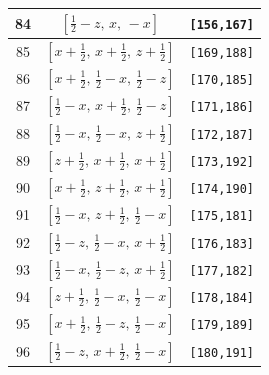 \documentclass[fleqn,8pt]{jsarticle}
\begin{document}
\begin{longtable}{ccc}
84 & $\left[ \frac{1}{2} - z,\, x,\, - x \right]$ & {\tt [156,167]} \\ \hline
85 & $\left[ x + \frac{1}{2},\, x + \frac{1}{2},\, z + \frac{1}{2} \right]$ & {\tt [169,188]} \\ \hline
86 & $\left[ x + \frac{1}{2},\, \frac{1}{2} - x,\, \frac{1}{2} - z \right]$ & {\tt [170,185]} \\ \hline
87 & $\left[ \frac{1}{2} - x,\, x + \frac{1}{2},\, \frac{1}{2} - z \right]$ & {\tt [171,186]} \\ \hline
88 & $\left[ \frac{1}{2} - x,\, \frac{1}{2} - x,\, z + \frac{1}{2} \right]$ & {\tt [172,187]} \\ \hline
89 & $\left[ z + \frac{1}{2},\, x + \frac{1}{2},\, x + \frac{1}{2} \right]$ & {\tt [173,192]} \\ \hline
90 & $\left[ x + \frac{1}{2},\, z + \frac{1}{2},\, x + \frac{1}{2} \right]$ & {\tt [174,190]} \\ \hline
91 & $\left[ \frac{1}{2} - x,\, z + \frac{1}{2},\, \frac{1}{2} - x \right]$ & {\tt [175,181]} \\ \hline
92 & $\left[ \frac{1}{2} - z,\, \frac{1}{2} - x,\, x + \frac{1}{2} \right]$ & {\tt [176,183]} \\ \hline
93 & $\left[ \frac{1}{2} - x,\, \frac{1}{2} - z,\, x + \frac{1}{2} \right]$ & {\tt [177,182]} \\ \hline
94 & $\left[ z + \frac{1}{2},\, \frac{1}{2} - x,\, \frac{1}{2} - x \right]$ & {\tt [178,184]} \\ \hline
95 & $\left[ x + \frac{1}{2},\, \frac{1}{2} - z,\, \frac{1}{2} - x \right]$ & {\tt [179,189]} \\ \hline
96 & $\left[ \frac{1}{2} - z,\, x + \frac{1}{2},\, \frac{1}{2} - x \right]$ & {\tt [180,191]} \\
\end{longtable}
\renewcommand{\arraystretch}{1.2}
\end{document}
